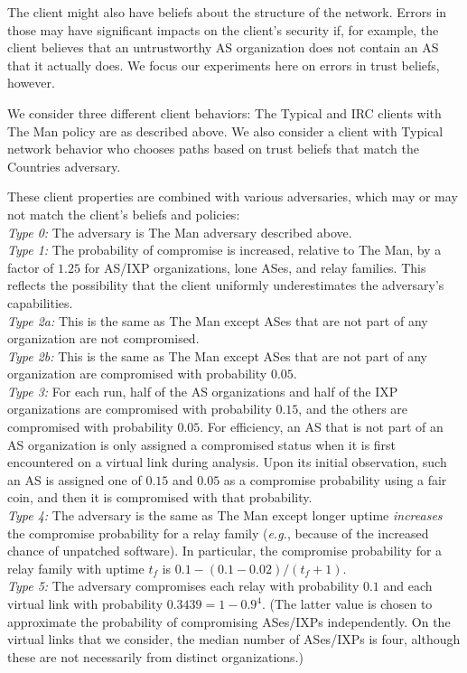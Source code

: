 \documentclass[conference]{styles/IEEEtran}
\newcommand{\eg}{\emph{e.g.}}
\begin{document}
The client might also have beliefs about the structure of the network.  Errors in those may have significant impacts on the client's security if, for example, the client believes that an untrustworthy AS organization does not contain an AS that it actually does. We focus our experiments here on errors in trust beliefs, however. 

We consider three different client behaviors:  The Typical and IRC clients with \textsf{The Man}
policy are as described above.  We also consider a client with Typical network behavior who chooses
paths based on trust beliefs that match the \textsf{Countries} adversary.  

These client properties are combined with various adversaries, which may or may not match the client's beliefs and policies:\\
    \textit{Type 0:} The adversary is \textsf{The Man} adversary described above.\\
	\textit{Type 1:} The probability of compromise is increased, relative to \textsf{The Man}, by a factor of $1.25$ for AS/IXP organizations, lone ASes, and relay families.  This reflects the possibility that the client uniformly underestimates the adversary's capabilities.\\
	\textit{Type 2a:} This is the same as \textsf{The Man} except ASes that are not part of any organization are not compromised.\\
	\textit{Type 2b:} This is the same as \textsf{The Man} except ASes that are not part of any organization are compromised with probability $0.05$.\\
	\textit{Type 3:} For each run, half of the AS organizations and half of the IXP organizations are compromised with probability $0.15$, and the others are compromised with probability $0.05$. For
efficiency, an AS that is not part of an AS organization is only assigned a compromised status
when it is first encountered on a virtual link during analysis. Upon its initial observation, such
an AS is assigned one of $0.15$ and $0.05$ as a compromise probability using a fair coin, and then
it is compromised with that probability.\\
	\textit{Type 4:} The adversary is the same as \textsf{The Man} except longer uptime \emph{increases} the compromise probability for a relay family (\eg, because of the increased chance of unpatched software).  In particular, the compromise probability for a relay family with uptime $t_f$ is $0.1 - (0.1-0.02)/(t_f + 1)$.\\
	\textit{Type 5:} The adversary compromises each relay with probability $0.1$ and each virtual link with probability $0.3439 = 1-0.9^4$.  (The latter value is chosen to approximate the probability of compromising ASes/IXPs independently.  On the virtual links that we consider, the median number of ASes/IXPs is four, although these are not necessarily from distinct organizations.)\\
\end{document}
